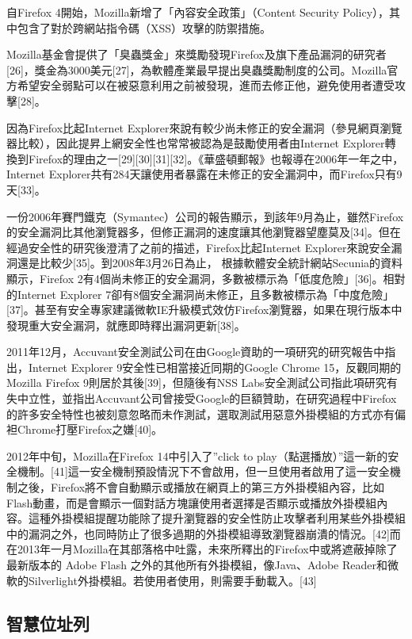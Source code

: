 \documentclass[12pt, a4paper]{article}
\begin{document}
自Firefox 4開始，Mozilla新增了「內容安全政策」（Content Security Policy），其中包含了對於跨網站指令碼（XSS）攻擊的防禦措施。

Mozilla基金會提供了「臭蟲獎金」來獎勵發現Firefox及旗下產品漏洞的研究者[26]，獎金為3000美元[27]，為軟體產業最早提出臭蟲獎勵制度的公司。Mozilla官方希望安全弱點可以在被惡意利用之前被發現，進而去修正他，避免使用者遭受攻擊[28]。

因為Firefox比起Internet Explorer來說有較少尚未修正的安全漏洞（參見網頁瀏覽器比較），因此提昇上網安全性也常常被認為是鼓勵使用者由Internet Explorer轉換到Firefox的理由之一[29][30][31][32]。《華盛頓郵報》也報導在2006年一年之中，Internet Explorer共有284天讓使用者暴露在未修正的安全漏洞中，而Firefox只有9天[33]。

一份2006年賽門鐵克（Symantec）公司的報告顯示，到該年9月為止，雖然Firefox的安全漏洞比其他瀏覽器多，但修正漏洞的速度讓其他瀏覽器望塵莫及[34]。但在經過安全性的研究後澄清了之前的描述，Firefox比起Internet Explorer來說安全漏洞還是比較少[35]。到2008年3月26日為止， 根據軟體安全統計網站Secunia的資料顯示，Firefox 2有4個尚未修正的安全漏洞，多數被標示為「低度危險」[36]。相對的Internet Explorer 7卻有8個安全漏洞尚未修正，且多數被標示為「中度危險」[37]。甚至有安全專家建議微軟IE升級模式效仿Firefox瀏覽器，如果在現行版本中發現重大安全漏洞，就應即時釋出漏洞更新[38]。

2011年12月，Accuvant安全測試公司在由Google資助的一項研究的研究報告中指出，Internet Explorer 9安全性已相當接近同期的Google Chrome 15，反觀同期的Mozilla Firefox 9則居於其後[39]，但隨後有NSS Labs安全測試公司指此項研究有失中立性，並指出Accuvant公司曾接受Google的巨額贊助，在研究過程中Firefox的許多安全特性也被刻意忽略而未作測試，選取測試用惡意外掛模組的方式亦有偏袒Chrome打壓Firefox之嫌[40]。

2012年中旬，Mozilla在Firefox 14中引入了''click to play（點選播放）''這一新的安全機制。[41]這一安全機制預設情況下不會啟用，但一旦使用者啟用了這一安全機制之後，Firefox將不會自動顯示或播放在網頁上的第三方外掛模組內容，比如Flash動畫，而是會顯示一個對話方塊讓使用者選擇是否顯示或播放外掛模組內容。這種外掛模組提醒功能除了提升瀏覽器的安全性防止攻擊者利用某些外掛模組中的漏洞之外，也同時防止了很多過期的外掛模組導致瀏覽器崩潰的情況。[42]而在2013年一月Mozilla在其部落格中吐露，未來所釋出的Firefox中或將遮蔽掉除了最新版本的 Adobe Flash 之外的其他所有外掛模組，像Java、Adobe Reader和微軟的Silverlight外掛模組。若使用者使用，則需要手動載入。[43]

\subsection{智慧位址列}
\end{document}

